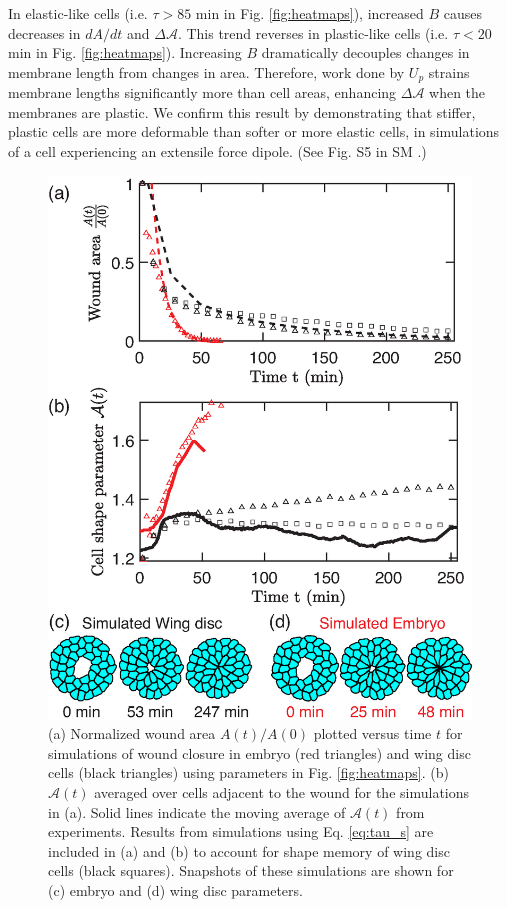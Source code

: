 \documentclass[%
 reprint,
superscriptaddress,
amsmath,amssymb,
prl,
floatfix,
]{revtex4-2}
\begin{document}
In elastic-like cells (i.e. $\tau>85$ min in Fig. \ref{fig:heatmaps}), increased $B$ causes decreases in $dA/dt$ and $\Delta\mathcal{A}$. This trend reverses in plastic-like cells (i.e. $\tau < 20$ min in Fig. \ref{fig:heatmaps}). Increasing $B$ dramatically decouples changes in membrane length from changes in area. Therefore, work done by $U_p$ strains membrane lengths significantly more than cell areas, enhancing $\Delta\mathcal{A}$ when the membranes are plastic. We confirm this result by demonstrating that stiffer, plastic cells are more deformable than softer or more elastic cells, in simulations of a cell experiencing an extensile force dipole. (See Fig. S5 in SM \cite{supp}.)


\begin{figure}[t]
    \centering
    \includegraphics[width=\linewidth]{Fig4.eps}
\caption{(a) Normalized wound area $A(t)/A(0)$ plotted versus time $t$ for simulations of wound closure in embryo (red triangles) and wing disc cells (black triangles) using parameters in Fig. \ref{fig:heatmaps}. (b) $\mathcal{A}(t)$ averaged over cells adjacent to the wound for the simulations in (a). Solid lines indicate the moving average of $\mathcal{A}(t)$ from experiments. Results from simulations using Eq. \ref{eq:tau_s} are included in (a) and (b) to account for shape memory of wing disc cells (black squares). Snapshots of these simulations are shown for (c) embryo and (d) wing disc parameters.
}
\label{fig:validation}
\end{figure}
\end{document}
